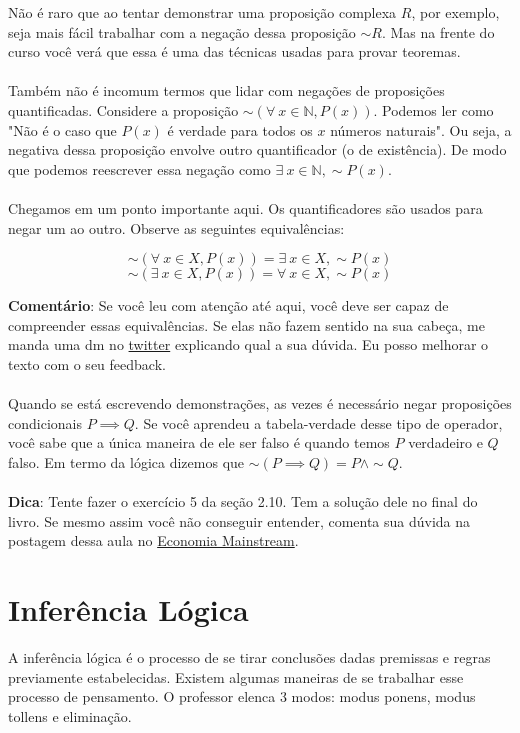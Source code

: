 \documentclass[a4paper,11pt,oneside]{book}
\theoremstyle{definition}
\theoremstyle{break}
\begin{document}
Não é raro que ao tentar demonstrar uma proposição complexa $R$, por exemplo, seja mais fácil trabalhar com a negação dessa proposição $\sim R$. Mas na frente do curso você verá que essa é uma das técnicas usadas para provar teoremas.
\\
\\
Também não é incomum termos que lidar com negações de proposições quantificadas. Considere a proposição $\sim(\forall \ x \in \mathbb{N}, P(x))$. Podemos ler como "Não é o caso que $P(x)$ é verdade para todos os $x$ números naturais". Ou seja, a negativa dessa proposição envolve outro quantificador (o de existência). De modo que podemos reescrever essa negação como $\exists \ x \in \mathbb{N},\sim P(x)$.
\\
\\
Chegamos em um ponto importante aqui. Os quantificadores são usados para negar um ao outro. Observe as seguintes equivalências:

$$ \sim (\forall \ x \in X, P(x)) = \exists \ x \in X, \sim P(x) $$
$$ \sim (\exists \ x \in X, P(x)) = \forall \ x \in X, \sim P(x) $$

\textbf{Comentário}: Se você leu com atenção até aqui, você deve ser capaz de compreender essas equivalências. Se elas não fazem sentido na sua cabeça, me manda uma dm no \href{https://twitter.com/bruno_ruas2}{twitter} explicando qual a sua dúvida. Eu posso melhorar o texto com o seu feedback.
\\
\\
Quando se está escrevendo demonstrações, as vezes é necessário negar proposições condicionais $P \implies Q$. Se você aprendeu a tabela-verdade desse tipo de operador, você sabe que a única maneira de ele ser falso é quando temos $P$ verdadeiro e $Q$ falso. Em termo da lógica dizemos que $\sim (P \implies Q) = P \land \sim Q$. 
\\
\\
\textbf{Dica}: Tente fazer o exercício 5 da seção 2.10. Tem a solução dele no final do livro. Se mesmo assim você não conseguir entender, comenta sua dúvida na postagem dessa aula no \href{https://economiamainstream.com.br/artigo/matematica/}{Economia Mainstream}.

\section{Inferência Lógica}

A inferência lógica é o processo de se tirar conclusões dadas premissas e regras previamente estabelecidas. Existem algumas maneiras de se trabalhar esse processo de pensamento. O professor elenca 3 modos: modus ponens, modus tollens e eliminação.
\end{document}
